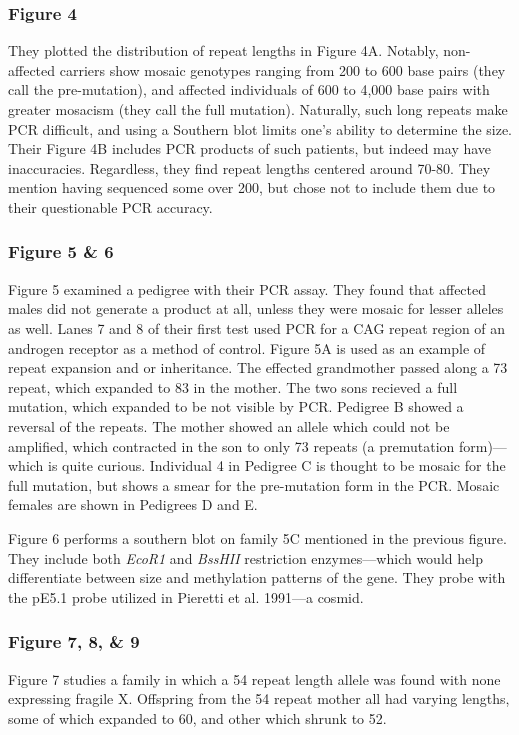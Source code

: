 \subsubsection*{Figure 4} 
They plotted the distribution of repeat lengths in Figure 4A. Notably, non-affected carriers show mosaic genotypes ranging from 200 to 600 base pairs (they call the pre-mutation), and affected individuals of 600 to 4,000 base pairs with greater mosacism (they call the full mutation). Naturally, such long repeats make PCR difficult, and using a Southern blot limits one's ability to determine the size. Their Figure 4B includes PCR products of such patients, but indeed may have inaccuracies. Regardless, they find repeat lengths centered around 70-80. They mention having sequenced some over 200, but chose not to include them due to their questionable PCR accuracy.

\subsubsection*{Figure 5 \& 6}

Figure 5 examined a pedigree with their PCR assay. They found that affected males did not generate a product at all, unless they were mosaic for lesser alleles as well. Lanes 7 and 8 of their first test used PCR for a CAG repeat region of an androgen receptor as a method of control. Figure 5A is used as an example of repeat expansion and or inheritance. The effected grandmother passed along a 73 repeat, which expanded to 83 in the mother. The two sons recieved a full mutation, which expanded to be not visible by PCR. Pedigree B showed a reversal of the repeats. The mother showed an allele which could not be amplified, which contracted in the son to only 73 repeats (a premutation form)---which is quite curious. Individual 4 in Pedigree C is thought to be mosaic for the full mutation, but shows a smear for the pre-mutation form in the PCR. Mosaic females are shown in Pedigrees D and E.\newline

Figure 6 performs a southern blot on family 5C mentioned in the previous figure. They include both \textit{EcoR1} and \textit{BssHII} restriction enzymes---which would help differentiate between size and methylation patterns of the gene. They probe with the pE5.1 probe utilized in Pieretti et al. 1991---a cosmid. 

\subsubsection*{Figure 7, 8, \& 9}
Figure 7 studies a family in which a 54 repeat length allele was found with none expressing fragile X. Offspring from the 54 repeat mother all had varying lengths, some of which expanded to 60, and other which shrunk to 52.\newline

